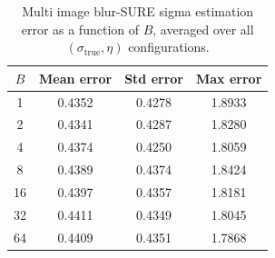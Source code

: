 \begin{table}[h]
\centering
\begin{tabular}{cccc}
\toprule
$B$ & Mean error & Std error & Max error \\
\midrule
1 & 0.4352 & 0.4278 & 1.8933 \\
2 & 0.4341 & 0.4287 & 1.8280 \\
4 & 0.4374 & 0.4250 & 1.8059 \\
8 & 0.4389 & 0.4374 & 1.8424 \\
16 & 0.4397 & 0.4357 & 1.8181 \\
32 & 0.4411 & 0.4349 & 1.8045 \\
64 & 0.4409 & 0.4351 & 1.7868 \\
\bottomrule
\end{tabular}
\caption{Multi image blur-SURE sigma estimation error as a function of $B$, averaged over all $(\sigma_{\text{true}}, \eta)$ configurations.}
\label{tab:multi_image_estimation}
\end{table}
